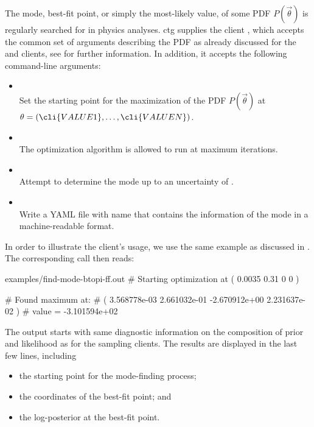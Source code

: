 The mode, best-fit point, or simply the most-likely value, of some \gls{PDF}
$P(\vec\theta)$ is regularly searched for in physics analyses. ctg supplies the
client , which accepts the common set of arguments
describing the PDF as already discussed for the  and
 clients, see  for
further information.  In addition, it accepts the following command-line
arguments:
\begin{itemize}
    \item[] \\[\medskipamount]
        Set the starting point for the maximization of the PDF $P(\vec\theta)$
        at $\theta = ( \cli{VALUE1}, \dots, \cli{VALUEN} )$.
    \item[] \\[\medskipamount]
        The optimization algorithm is allowed to run at maximum  iterations.
    \item[] \\[\medskipamount]
        Attempt to determine the mode up to an uncertainty of .
    \item[] \\[\medskipamount]
        Write a YAML file with name  that contains the information of
        the mode in a machine-readable format.
\end{itemize}

In order to illustrate the client's usage, we use the same example as
discussed in . The corresponding call
then reads:

\begin{filecontents*}{examples/find-mode-btopi-ff.out}
# Starting optimization at ( 0.0035 0.31 0 0 )

# Found maximum at:
#   ( 3.568778e-03 2.661032e-01 -2.670912e+00 2.231637e-02 )
#   value = -3.101594e+02
\end{filecontents*}
The output starts with same diagnostic information on the composition of
prior and likelihood as for the sampling clients. The results are displayed
in the last few lines, including
\begin{itemize}
    \item the starting point for the mode-finding process;
    \item the coordinates of the best-fit point; and
    \item the log-posterior at the best-fit point.
\end{itemize}

